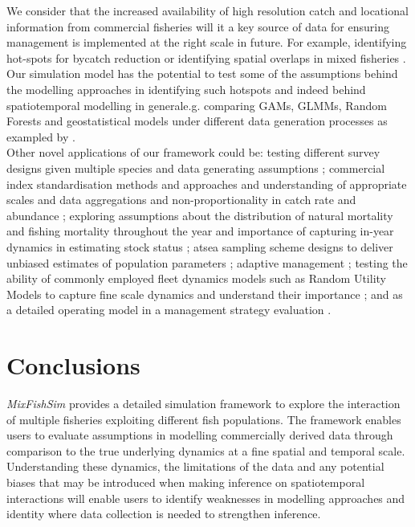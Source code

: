 \documentclass[review]{elsarticle}
\begin{document}
We consider that the increased availability of high resolution catch and
locational information from commercial fisheries will  it a key
source of data for ensuring management is implemented at the right scale in
future. For example, identifying hot-spots for bycatch reduction or identifying
spatial overlaps in mixed fisheries \citep{Dolder2018, Gardner2008, Little2014,
	Dedman2015, Ward2015}. Our simulation model has the potential to test
some of the assumptions behind the modelling approaches in identifying such
hotspots and indeed behind spatiotemporal modelling in general\replaced{, }{
	(}e.g. comparing GAMs, GLMMs, Random Forests and geostatistical models
under different data generation processes as exampled by
\cite{Stock2019}\deleted{)}. \\

Other novel applications of our framework could be: testing different survey
designs given multiple species and data generating assumptions \citep{Xu2015};
commercial index standardisation methods and approaches and understanding of
appropriate scales and data aggregations and non-proportionality in catch rate
and abundance \citep{Harley2001, Maunder2004}; exploring assumptions about the
distribution of natural mortality and fishing mortality throughout the year and
importance of capturing in-year dynamics in estimating stock status
\citep{Liu2013}; at\added{-}sea sampling scheme designs to deliver unbiased estimates
of population parameters \citep{Cotter2007, Kimura2006}; adaptive management
\citep{Walters2007, Dunn2016}; testing the ability of commonly employed fleet
dynamics models such as Random Utility Models to capture fine scale dynamics
and understand their importance \citep{Girardin2016}; and as a detailed
operating model in a management strategy evaluation \citep{Mahevas2004}. \\

\section{Conclusions}

\textit{MixFishSim} provides a detailed simulation framework to explore the
interaction of multiple fisheries exploiting different fish populations. The
framework enables users to evaluate assumptions in modelling commercially
derived data through comparison to the true underlying dynamics at a fine
spatial and temporal scale.  Understanding these dynamics, the limitations of
the data and any potential biases that may be introduced when making inference
on spatiotemporal interactions will enable users to identify weaknesses in
modelling approaches and identity where data collection is needed to strengthen
inference. \\
\end{document}
